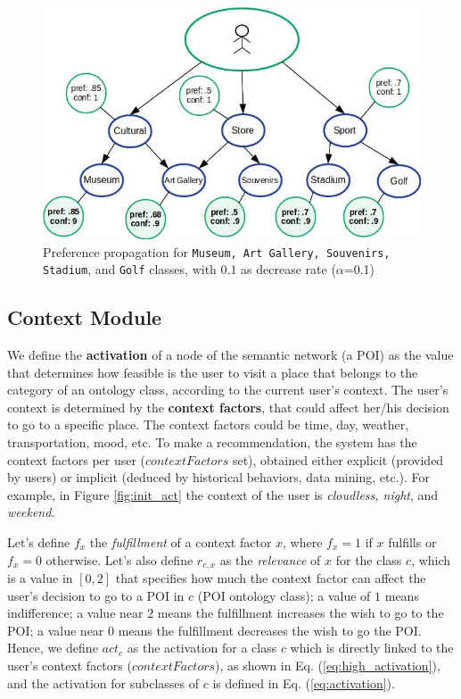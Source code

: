 \begin{figure}[h]
\centering
\includegraphics[scale=0.5]{draws/pref_spred.jpg}
\caption{Preference propagation for {\tt Museum, Art Gallery, Souvenirs, Stadium}, and {\tt Golf} classes, with 0.1 as decrease rate ($\alpha$=0.1)}
\label{fig:pref_prop}
\end{figure}

\subsection{Context Module}
We define the \textbf{activation} of a node of the semantic network (a POI) as the value that determines how feasible 
is the user to visit a place that belongs to the category of  an 
ontology class, according to the current user's context.
The user's context is determined by the \textbf{context factors}, 
that could affect her/his  decision to go to a specific place. The context factors could be time, day, weather, transportation, mood, etc. To make a recommendation, the system has the
context factors per user ($contextFactors$ set), obtained either explicit (provided by users) or implicit (deduced by historical behaviors, data mining, etc.).  For example, in Figure \ref{fig:init_act} the context of the user is
\textit{cloudless, night}, and \textit{weekend}.

Let's define $f_x$ the \textit{fulfillment} of a context factor 
$x$, where $f_x = 1$ if $x$ fulfills or $f_x = 0$ otherwise. Let's also define $r_{c,x}$ as the \textit{relevance} of $x$ for the class $c$, which is a value in $[0, 2]$ that specifies how much the context factor %
can affect the user's decision to go to a POI in $c$ (POI ontology class); a value of $1$ means indifference; a value near $2$ means the fulfillment increases the wish to go to the POI; a value near $0$ means the fulfillment decreases the wish to go the POI. Hence, we define $act_c$ as the activation for a class $c$ which is directly linked to the user's context factors 
($contextFactors$), as shown in Eq. (\ref{eq:high_activation}), and the activation for subclasses of $c$
is defined in Eq. (\ref{eq:activation}).


